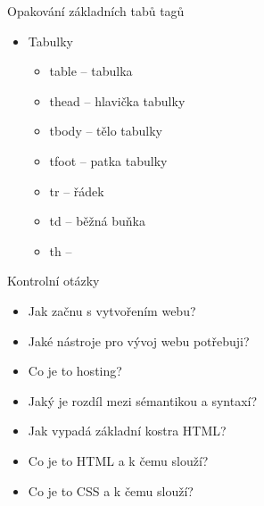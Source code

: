 \documentclass{beamer}
\begin{document}
\begin{frame}[shrink]{Opakování základních tabů tagů}
\begin{multicols}{2}
	\begin{itemize}	
		\item Tabulky
		\begin{itemize}
			\item table -- tabulka
			\item thead -- hlavička tabulky
			\item tbody -- tělo tabulky
			\item tfoot -- patka tabulky
			\item tr -- řádek
			\item td -- běžná buňka
			\item th -- 
		\end{itemize}
	\end{itemize}


\end{multicols}
\end{frame}


\begin{frame}{Kontrolní otázky}
\begin{itemize}
	\item Jak začnu s vytvořením webu?
	\item Jaké nástroje pro vývoj webu potřebuji?
	\item Co je to hosting?
	\item Jaký je rozdíl mezi sémantikou a syntaxí?
	\item Jak vypadá základní kostra HTML?
	\item Co je to HTML a k čemu slouží?
	\item Co je to CSS a k čemu slouží?
\end{itemize}
	
\end{frame}


	  
\end{document}
